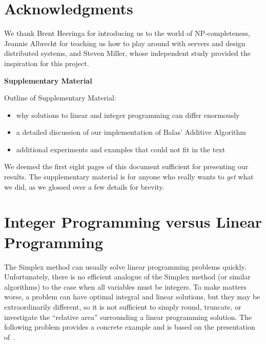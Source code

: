 \documentclass{article}
\begin{document}
\section*{Acknowledgments}
 
We thank Brent Heeringa for introducing us to the world of NP-completeness, Jeannie Albrecht for teaching us how to play around with servers and
design distributed systems, and Steven Miller, whose independent study provided the inspiration for this project.











\onecolumn

\appendix

\begin{center}
{\Large \textbf{Supplementary Material}}
\end{center}

Outline of Supplementary Material:

\begin{itemize}[noitemsep]
    \item why solutions to linear and integer programming can differ enormously
    \item a detailed discussion of our implementation of Balas' Additive Algorithm
    \item additional experiments and examples that could not fit in the text
\end{itemize}

We deemed the first eight pages of this document sufficient for presenting our results. The supplementary material is for anyone who really wants to
\emph{get} what we did, as we glossed over a few details for brevity.

\section{Integer Programming versus Linear Programming}\label{app:lin_vs_int}

The Simplex method can usually solve linear programming problems quickly. Unfortunately, there is no efficient analogue of the Simplex method (or
similar algorithms) to the case when all variables must be integers. To make matters worse, a problem can have optimal integral and linear solutions,
but they may be extraordinarily different, so it is not sufficient to simply round, truncate, or investigate the ``relative area'' surrounding a
linear programming solution. The following problem provides a concrete example and is based on the presentation of~\cite{stevenmiller}.
\end{document}
